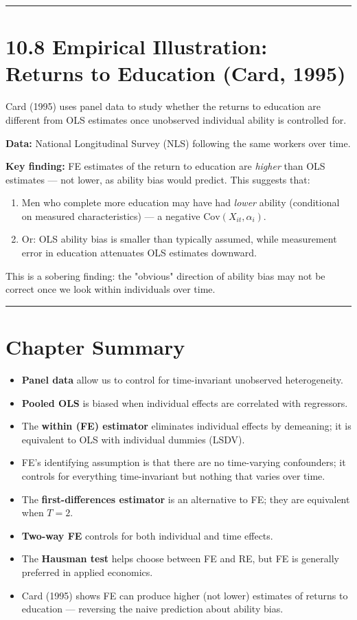 \medskip\hrule\medskip

\section{10.8 Empirical Illustration: Returns to Education (Card, 1995)}

Card (1995) uses panel data to study whether the returns to education are different from OLS estimates once unobserved individual ability is controlled for.

\textbf{Data:} National Longitudinal Survey (NLS) following the same workers over time.

\textbf{Key finding:} FE estimates of the return to education are \textit{higher} than OLS estimates --- not lower, as ability bias would predict. This suggests that:

\begin{enumerate}
\item Men who complete more education may have had \textit{lower} ability (conditional on measured characteristics) --- a negative $\text{Cov}(X_{it}, \alpha_i)$.
\item Or: OLS ability bias is smaller than typically assumed, while measurement error in education attenuates OLS estimates downward.
\end{enumerate}

This is a sobering finding: the "obvious" direction of ability bias may not be correct once we look within individuals over time.

\medskip\hrule\medskip

\section{Chapter Summary}

\begin{itemize}
\item \textbf{Panel data} allow us to control for time-invariant unobserved heterogeneity.
\item \textbf{Pooled OLS} is biased when individual effects are correlated with regressors.
\item The \textbf{within (FE) estimator} eliminates individual effects by demeaning; it is equivalent to OLS with individual dummies (LSDV).
\item FE's identifying assumption is that there are no time-varying confounders; it controls for everything time-invariant but nothing that varies over time.
\item The \textbf{first-differences estimator} is an alternative to FE; they are equivalent when $T = 2$.
\item \textbf{Two-way FE} controls for both individual and time effects.
\item The \textbf{Hausman test} helps choose between FE and RE, but FE is generally preferred in applied economics.
\item Card (1995) shows FE can produce higher (not lower) estimates of returns to education --- reversing the naive prediction about ability bias.
\end{itemize}


